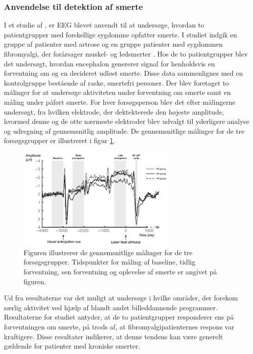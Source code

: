 \subsubsection{Anvendelse til detektion af smerte}
I et studie af \citep{Brown2013}, er EEG blevet anvendt til at undersøge, hvordan to patientgrupper med forskellige sygdomme opfatter smerte. I studiet indgik en gruppe af patienter med artrose og en gruppe patienter med sygdommen fibromyalgi, der forårsager muskel- og ledsmerter \citep{Brown2013}\citep{9}. Hos de to patientgrupper blev det undersøgt, hvordan encephalon genererer signal for henholdsvis en forventning om og en decideret udløst smerte. Disse data sammenlignes med en kontrolgruppe bestående af raske, smertefri personer. Der blev foretaget to målinger for at undersøge aktiviteten under forventning om smerte samt en måling under påført smerte. For hver forsøgsperson blev det efter målingerne undersøgt, fra hvilken elektrode, der dektekterede den højeste amplitude, hvormed denne og de otte nærmeste elektroder blev udvalgt til yderligere analyse og udregning af gennemsnitlig amplitude. De gennemsnitlige målinger for de tre forsøgsgrupper er illustreret i figur \ref{fig:EEG_gns}.
\begin{figure}[H] 
	\begin{center}
		\includegraphics[width=0.7\textwidth]{figures/bProblemanalyse/EEG_ERP}
	\end{center}
	\caption{Figuren illustrerer de gennemsnitlige målinger for de tre forsøgsgrupper. Tidspunkter for måling af baseline, tidlig forventning, sen forventning og oplevelse af smerte er angivet på figuren. \citep{Brown2013}} 
	\label{fig:EEG_gns} 
\end{figure} 
Ud fra resultaterne var det muligt at undersøge i hvilke områder, der forekom særlig aktivitet ved hjælp af blandt andet billeddannende programmer. Resultaterne for studiet antyder, at de to patientgrupper responderer ens på forventningen om smerte, på trods af, at fibromyalgipatienternes respons var kraftigere. Disse resultater indikerer, at denne tendens kan være generelt gældende for patienter med kroniske smerter. \citep{Brown2013}
